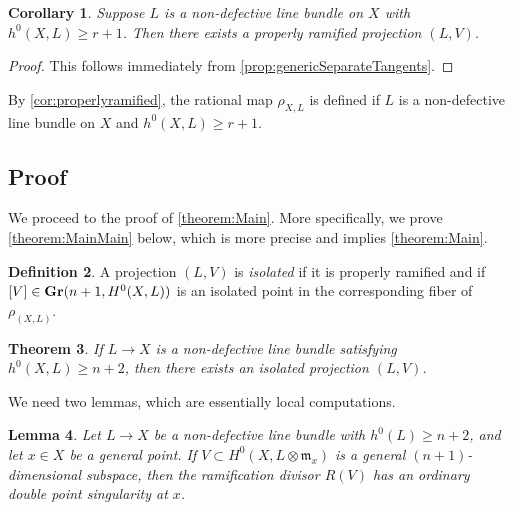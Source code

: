 \documentclass[11pt,reqno]{amsart}
\theoremstyle{plain}
\newtheorem{theorem}{Theorem}[section]
\newtheorem{lemma}[theorem]{Lemma}
\newtheorem{corollary}[theorem]{Corollary}
\theoremstyle{definition}
\newtheorem{definition}[theorem]{Definition}
\theoremstyle{remark}
\numberwithin{equation}{section}
\renewcommand{\to}{{\longrightarrow}}
\numberwithin{equation}{section}
\begin{document}
\begin{corollary}\label{cor:properlyramified}
  Suppose $L$ is a non-defective line bundle on $X$ with $h^{0}(X,L) \geq r+1$.
  Then there exists a properly ramified projection $(L,V)$.
\end{corollary}

\begin{proof}
  This follows immediately from \autoref{prop:genericSeparateTangents}.
\end{proof}
By \autoref{cor:properlyramified}, the rational map $\rho_{X,L}$ is defined if $L$ is a non-defective line bundle on $X$ and $h^0(X, L) \geq r+1$.


\subsection{Proof}
We proceed to the proof of \autoref{theorem:Main}. More specifically, we prove \autoref{theorem:MainMain} below, which is more precise and implies \autoref{theorem:Main}.



\begin{definition}
   A projection $(L,V)$ is {\sl isolated} if it is properly ramified and if $[V] \in {\bf Gr}(n+1,H^{0}(X,L))$ is an isolated point in the corresponding fiber of $\rho_{(X,L)}$.
\end{definition}



\begin{theorem}
  \label{theorem:MainMain}
  If $L \to X$ is a non-defective line bundle satisfying $h^{0}(X,L) \geq n+2$, then there exists an isolated projection $(L,V)$.
\end{theorem}

We need two lemmas, which are essentially local computations.

\begin{lemma}\label{lemma:tangentconeRam}
  Let $L \to X$ be a non-defective line bundle with $h^{0}(L) \geq n+2$, and let $x \in X$ be a general point.  If $V \subset H^{0}(X,  L \otimes {\mathfrak m}_{x})$ is a general $(n+1)$-dimensional subspace, then the ramification divisor $R(V)$ has an ordinary double point singularity at $x$. 
\end{lemma}
\end{document}
